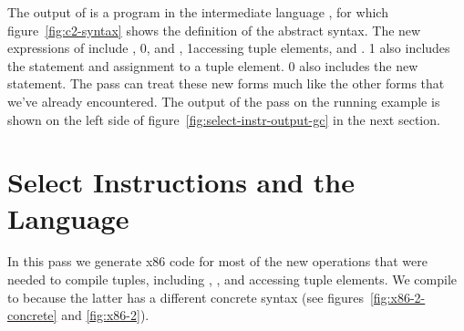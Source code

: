 \documentclass[7x10]{TimesAPriori_MIT}%
\def\racketEd{0}
\def\pythonEd{1}
\def\edition{0}
\newcommand{\racket}[1]{{\if\edition\racketEd{#1}\fi}}
\newcommand{\python}[1]{{\if\edition\pythonEd #1\fi}}
\numberwithin{theorem}{chapter}
\numberwithin{definition}{chapter}
\numberwithin{equation}{chapter}
\begin{document}
The output of  is a program in the
intermediate language \LangCVec{}, for which figure~\ref{fig:c2-syntax}
shows the definition of the abstract syntax.
%
%
The new expressions of \LangCVec{} include ,
%
\racket{, and ,}
%
\python{accessing tuple elements,}
%
and .
%
\python{\LangCVec{} also includes the  statement and
assignment to a tuple element.}
%
\racket{\LangCVec{} also includes the new \code{collect} statement.}
%
The  pass can treat these new forms much like
the other forms that we've already encountered.  The output of the
 pass on the running example is shown on the
left side of figure~\ref{fig:select-instr-output-gc} in the next
section.


\section{Select Instructions and the \LangXGlobal{} Language}
\label{sec:select-instructions-gc}


In this pass we generate x86 code for most of the new operations that
were needed to compile tuples, including ,
, and accessing tuple elements.
%
We compile  to  because the latter has a
different concrete syntax (see figures~\ref{fig:x86-2-concrete} and
\ref{fig:x86-2}).  
\end{document}
